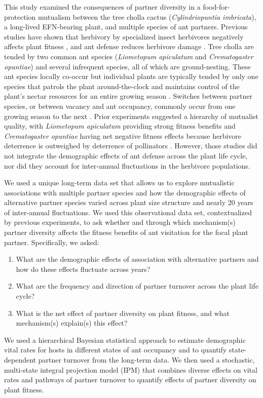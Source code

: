 \documentclass[11pt]{article}
\begin{document}
This study examined the consequences of partner diversity in a food-for-protection mutualism between the tree cholla cactus (\textit{Cylindriopuntia imbricata}), a long-lived EFN-bearing plant, and multiple species of ant partners.
Previous studies have shown that herbivory by specialized insect herbivores negatively affects plant fitness \cite{Miller2009}, and ant defense reduces herbivore damage \cite{Miller2007}. 
Tree cholla are tended by two common ant species (\textit{Liometopum apiculatum} and \textit{Crematogaster opuntiae}) and several infrequent species, all of which are ground-nesting. 
These ant species locally co-occur but individual plants are typically tended by only one species that patrols the plant around-the-clock and maintains control of the plant's nectar resources for an entire growing season \citep{Ohm2014, Donald2022}. 
Switches between partner species, or between vacancy and ant occupancy, commonly occur from one growing season to the next \citep{Miller2007}. 
Prior experiments suggested a hierarchy of mutualist quality, with \textit{Liometopum apiculatum} providing strong fitness benefits and \textit{Crematogaster opuntiae} having net negative fitness effects because herbivore deterrence is outweighed by deterrence of pollinators \citep{Miller2007,Ohm2014}. 
However, those studies did not integrate the demographic effects of ant defense across the plant life cycle, nor did they account for inter-annual fluctuations in the herbivore populations.

	
We used a unique long-term data set that allows us to explore mutualistic associations with multiple partner species and how the demographic effects of alternative partner species varied across plant size structure and nearly 20 years of inter-annual fluctuations. 
We used this observational data set, contextualized by previous experiments, to ask whether and through which mechanism(s) partner diversity affects the fitness benefits of ant visitation for the focal plant partner. 
Specifically, we asked:
	\begin{enumerate}	
		\item{What are the demographic effects of association with alternative partners and how do these effects fluctuate across years?}
		\item{What are the frequency and direction of partner turnover across the plant life cycle?}	
		\item{What is the net effect of partner diversity on plant fitness, and what mechanism(s) explain(s) this effect?}
	\end{enumerate}
We used a hierarchical Bayesian statistical approach to estimate demographic vital rates for hosts in different states of ant occupancy and to quantify state-dependent partner turnover from the long-term data. 
We then used a stochastic, multi-state integral projection model (IPM) that combines diverse effects on vital rates and pathways of partner turnover to quantify effects of partner diversity on plant fitness. 
\end{document}
